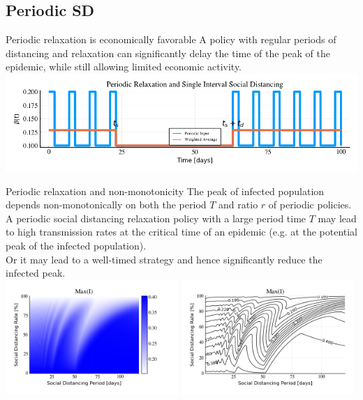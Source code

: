 \documentclass[10pt]{beamer}
\begin{document}
\subsection{Periodic SD}
\begin{frame}{Periodic relaxation is economically favorable}
	 A policy with regular periods of distancing and relaxation can significantly delay the time of the peak of the epidemic, while still allowing limited economic activity. \\ \vspace{1cm}
	\includegraphics[width=1\textwidth]{epidemic-combination.png}
\end{frame}

\begin{frame}{Periodic relaxation and non-monotonicity}
	The peak of infected population depends non-monotonically on both the period $T$ and ratio $r$ of periodic policies. \\ \vspace{0.5cm}
	A periodic social distancing relaxation policy with a large period time $T$ may lead to high transmission rates at the critical time of an epidemic (e.g. at the potential peak of the infected population).  \\ \vspace{0.5cm}
	Or it may lead to a well-timed strategy and hence significantly reduce the infected peak. \\ \vspace{0.5cm}
	\includegraphics[width=0.49\textwidth]{epidemic-periodic-heatmap.png}
	\includegraphics[width=0.49\textwidth]{epidemic-periodic-contour.png} 
\end{frame}
\end{document}
